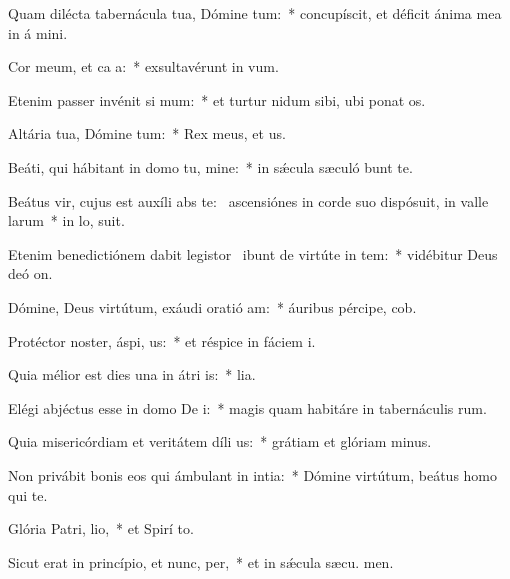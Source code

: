 \item Quam dilécta tabernácula tua, Dómine tum:~* concupíscit, et déficit ánima mea in á mini.
\item Cor meum, et ca a:~* exsultavérunt in  vum.
\item Etenim passer invénit si mum:~* et turtur nidum sibi, ubi ponat  os.
\item Altária tua, Dómine tum:~* Rex meus, et  us.
\item Beáti, qui hábitant in domo tu, mine:~* in sǽcula sæculó bunt te.
\item Beátus vir, cujus est auxíli abs te:~\pscross{} ascensiónes in corde suo dispósuit, in valle larum~* in lo,  suit.
\item Etenim benedictiónem dabit legistor~\pscross{} ibunt de virtúte in tem:~* vidébitur Deus deó  on.
\item Dómine, Deus virtútum, exáudi oratió am:~* áuribus pércipe,  cob.
\item Protéctor noster, áspi, us:~* et réspice in fáciem  i.
\item Quia mélior est dies una in átri is:~*  lia.
\item Elégi abjéctus esse in domo De i:~* magis quam habitáre in tabernáculis rum.
\item Quia misericórdiam et veritátem díli us:~* grátiam et glóriam  minus.
\item Non privábit bonis eos qui ámbulant in intia:~* Dómine virtútum, beátus homo qui   te.
\item Glória Patri,  lio,~* et Spirí to.
\item Sicut erat in princípio, et nunc,  per,~* et in sǽcula sæcu. men.
